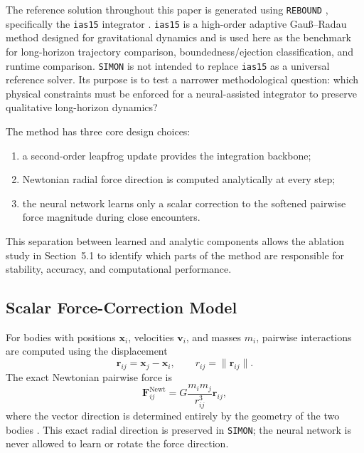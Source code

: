 \documentclass[12pt]{article}
\begin{document}
The reference solution throughout this paper is generated using \texttt{REBOUND}
\citep{Rein2012}, specifically the \texttt{ias15} integrator \citep{Rein_2014}. \texttt{ias15}
is a high-order adaptive Gau\ss--Radau method designed for gravitational dynamics and is
used here as the benchmark for long-horizon trajectory comparison, boundedness/ejection
classification, and runtime comparison. \texttt{SIMON} is not intended to replace
\texttt{ias15} as a universal reference solver. Its purpose is to test a narrower methodological
question: which physical constraints must be enforced for a neural-assisted integrator to
preserve qualitative long-horizon dynamics?

The method has three core design choices:
\begin{enumerate}
    \item a second-order leapfrog update provides the integration backbone;
    \item Newtonian radial force direction is computed analytically at every step;
    \item the neural network learns only a scalar correction to the softened pairwise force
    magnitude during close encounters.
\end{enumerate}
This separation between learned and analytic components allows the ablation study in
Section~5.1 to identify which parts of the method are responsible for stability, accuracy,
and computational performance.

\subsection{Scalar Force-Correction Model}

For bodies with positions $\mathbf{x}_i$, velocities $\mathbf{v}_i$, and masses $m_i$, pairwise
interactions are computed using the displacement
\[
\mathbf{r}_{ij}=\mathbf{x}_j-\mathbf{x}_i,\qquad
r_{ij}=\|\mathbf{r}_{ij}\|.
\]
The exact Newtonian pairwise force is
\[
\mathbf{F}_{ij}^{\mathrm{Newt}}
=
G\frac{m_i m_j}{r_{ij}^3}\mathbf{r}_{ij},
\]
where the vector direction is determined entirely by the geometry of the two bodies
\cite{murray1999solar}. This exact radial direction is preserved in \texttt{SIMON}; the neural
network is never allowed to learn or rotate the force direction.
\end{document}
